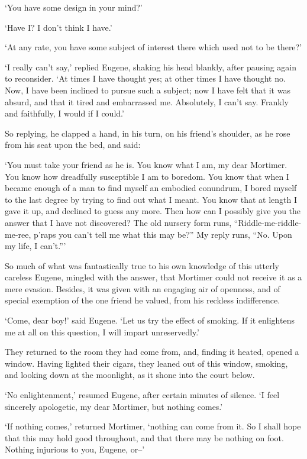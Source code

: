 ‘You have some design in your mind?’

‘Have I? I don’t think I have.’

‘At any rate, you have some subject of interest there which used not to
be there?’

‘I really can’t say,’ replied Eugene, shaking his head blankly, after
pausing again to reconsider. ‘At times I have thought yes; at other
times I have thought no. Now, I have been inclined to pursue such a
subject; now I have felt that it was absurd, and that it tired and
embarrassed me. Absolutely, I can’t say. Frankly and faithfully, I would
if I could.’

So replying, he clapped a hand, in his turn, on his friend’s shoulder,
as he rose from his seat upon the bed, and said:

‘You must take your friend as he is. You know what I am, my dear
Mortimer. You know how dreadfully susceptible I am to boredom. You know
that when I became enough of a man to find myself an embodied conundrum,
I bored myself to the last degree by trying to find out what I meant.
You know that at length I gave it up, and declined to guess any more.
Then how can I possibly give you the answer that I have not discovered?
The old nursery form runs, “Riddle-me-riddle-me-ree, p’raps you can’t
tell me what this may be?” My reply runs, “No. Upon my life, I can’t.”’

So much of what was fantastically true to his own knowledge of this
utterly careless Eugene, mingled with the answer, that Mortimer could
not receive it as a mere evasion. Besides, it was given with an engaging
air of openness, and of special exemption of the one friend he valued,
from his reckless indifference.

‘Come, dear boy!’ said Eugene. ‘Let us try the effect of smoking. If it
enlightens me at all on this question, I will impart unreservedly.’

They returned to the room they had come from, and, finding it heated,
opened a window. Having lighted their cigars, they leaned out of this
window, smoking, and looking down at the moonlight, as it shone into the
court below.

‘No enlightenment,’ resumed Eugene, after certain minutes of silence. ‘I
feel sincerely apologetic, my dear Mortimer, but nothing comes.’

‘If nothing comes,’ returned Mortimer, ‘nothing can come from it. So
I shall hope that this may hold good throughout, and that there may be
nothing on foot. Nothing injurious to you, Eugene, or--’

